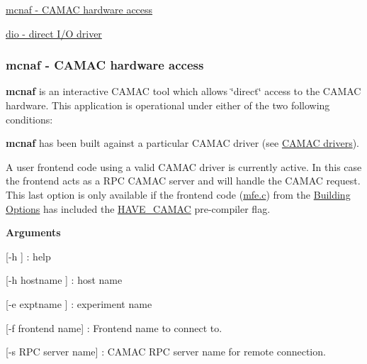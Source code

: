 \par



\begin{DoxyItemize}
\item \hyperlink{FE_utils_FE_mcnaf_utility}{mcnaf -\/ CAMAC hardware access}
\item \hyperlink{FE_utils_FE_dio_utility}{dio -\/ direct I/O driver}
\end{DoxyItemize}\hypertarget{FE_utils_FE_mcnaf_utility}{}\subsubsection{mcnaf        -\/ CAMAC hardware access}\label{FE_utils_FE_mcnaf_utility}
{\bfseries mcnaf} is an interactive CAMAC tool which allows \char`\"{}direct\char`\"{} access to the CAMAC hardware. This application is operational under either of the two following conditions:
\begin{DoxyEnumerate}
\item {\bfseries mcnaf} has been built against a particular CAMAC driver (see \hyperlink{FE_Hardware_CAMAC_drivers}{CAMAC drivers}).
\item A user frontend code using a valid CAMAC driver is currently active. In this case the frontend acts as a RPC CAMAC server and will handle the CAMAC request. This last option is only available if the frontend code (\hyperlink{mfe_8c}{mfe.c}) from the \hyperlink{BuildingOptions_BO_building_option}{Building Options} has included the \hyperlink{BuildingOptions_BO_HAVE_CAMAC}{HAVE\_\-CAMAC} pre-\/compiler flag.
\end{DoxyEnumerate}


\begin{DoxyItemize}
\item {\bfseries  Arguments }
\begin{DoxyItemize}
\item \mbox{[}-\/h \mbox{]} : help
\item \mbox{[}-\/h hostname \mbox{]} : host name
\item \mbox{[}-\/e exptname \mbox{]} : experiment name
\item \mbox{[}-\/f frontend name\mbox{]} : Frontend name to connect to.
\item \mbox{[}-\/s RPC server name\mbox{]} : CAMAC RPC server name for remote connection.
\end{DoxyItemize}
\end{DoxyItemize}


